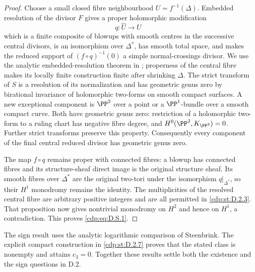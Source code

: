 \begin{proof}
Choose a small closed fibre neighbourhood $U=f^{-1}(\Delta)$.
Embedded resolution of the divisor $F$ gives a proper
holomorphic modification
\[
 q:\widehat U\longrightarrow U
\]
which is a finite composite of blowups with smooth centres in
the successive central divisors, is an isomorphism over
$\Delta^*$, has smooth total space, and makes the reduced
support of $(f\circ q)^{-1}(0)$ a simple normal-crossings
divisor. We use the analytic embedded-resolution theorem in
\cite[Theorem~1.6]{BierstoneMilman1997}; properness of the
central fibre makes its locally finite construction finite
after shrinking $\Delta$. The strict transform of $S$ is a
resolution of its normalization and has geometric genus zero
by birational invariance of holomorphic two-forms on smooth
compact surfaces. A new exceptional component is $\PP^2$ over
a point or a $\PP^1$-bundle over a smooth compact curve.
Both have geometric genus zero: restriction of a holomorphic
two-form to a ruling chart has negative fibre degree, and
$H^0(\PP^2,K_{\PP^2})=0$. Further strict transforms preserve
this property. Consequently every component of the final
central reduced divisor has geometric genus zero.

The map $f\circ q$ remains proper with connected fibres:
a blowup has connected fibres and its structure-sheaf direct
image is the original structure sheaf. Its smooth fibres over
$\Delta^*$ are the original two-tori under the isomorphism
$q|_{\Delta^*}$, so their $H^1$ monodromy remains the identity.
The multiplicities of the resolved central fibre are arbitrary
positive integers and are all permitted in \ref{cdp:st:D.2.3}. That
proposition now gives nontrivial monodromy on $H^2$ and hence
on $H^1$, a contradiction. This proves \eqref{cdp:eq:D.S.1}.
\end{proof}

The sign result uses the analytic logarithmic comparison of
Steenbrink. The explicit compact construction in \ref{cdp:st:D.2.7} proves
that the stated class is nonempty and attains $c_3=0$.
Together these results settle both the existence and the sign
questions in D.2.


